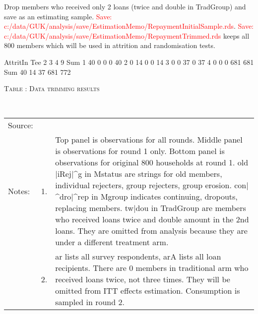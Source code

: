 Drop members who received only 2 loans (twice and double in \textsf{TradGroup}) and save as an estimating sample. \textcolor{red}{Save: c:/data/GUK/analysis/save/EstimationMemo/RepaymentInitialSample.rds}. \textcolor{red}{Save: c:/data/GUK/analysis/save/EstimationMemo/RepaymentTrimmed.rds} keeps all 800 members which will be used in attrition and randomisation tests.
\begin{Schunk}
\begin{Soutput}
     AttritIn
Tee     2   3   4   9 Sum
  1    40   0   0   0  40
  2     0  14   0   0  14
  3     0   0  37   0  37
  4     0   0   0 681 681
  Sum  40  14  37 681 772
\end{Soutput}
\end{Schunk}



\hspace{-1cm}\begin{minipage}[t]{14cm}
\hfil\textsc{\normalsize Table \thetable: Data trimming results\label{tab trim}}\\
\setlength{\tabcolsep}{1pt}
\setlength{\baselineskip}{8pt}
\renewcommand{\arraystretch}{.48}
\hfil{}\\
\renewcommand{\arraystretch}{.8}
\setlength{\tabcolsep}{1pt}
\begin{tabular}{>{\hfill\scriptsize}p{1cm}<{}>{\hfill\scriptsize}p{.25cm}<{}>{\scriptsize}p{12cm}<{\hfill}}
Source:& \multicolumn{2}{l}{\scriptsize GUK survey data.}\\
Notes: & 1. & Top panel is observations for all rounds. Middle panel is observations for round 1 only. Bottom panel is observations for original 800 households at round 1. old$|$iRej$|$\^{}g in \textsf{Mstatus} are strings for old members, individual rejecters, group rejecters, group erosion. con$|$\^{}dro$|$\^{}rep in \textsf{Mgroup} indicates continuing, dropouts, replacing members. tw$|$dou in \textsf{TradGroup} are members who received loans twice and double amount in the 2nd loans. They are omitted from analysis because they are under a different treatment arm. \\
& 2. & \textsf{ar} lists all survey respondents, \textsf{arA} lists all loan recipients. There are 0 members in \textsf{traditional} arm who received loans twice, not three times. They will be omitted from ITT effects estimation. Consumption is sampled in round 2.
\end{tabular}
\end{minipage}

